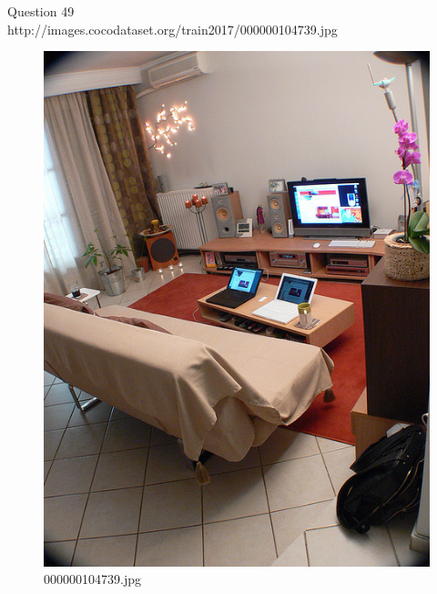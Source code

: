 Question 49\\
http://images.cocodataset.org/train2017/000000104739.jpg
\begin{figure}[h]
    \centering
    \includegraphics[width=0.8\linewidth]{../image set/hard/000000104739.jpg}
    \caption{000000104739.jpg}
\end{figure}
